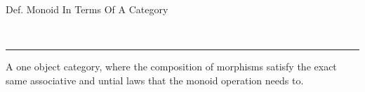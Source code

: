 \begin{note}
  \begin{field}
    Def. Monoid In Terms Of A Category
  \end{field} \\
  \noindent\rule[0.5ex]{\linewidth}{1pt}
  \begin{field}
    A one object category, where the composition of morphisms satisfy the exact same associative and untial laws that the monoid operation needs to.
  \end{field}
\end{note}

















